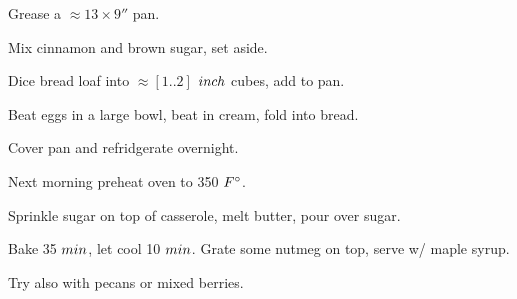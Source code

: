 \begin{preparation}
\item Grease a $\approx13\times9''$ pan.

\item Mix cinnamon and brown sugar, set aside.

\item Dice bread loaf into $\approx[1..2]$ $\inch$ cubes, add to pan.

\item Beat eggs in a large bowl, beat in cream, fold into bread.

\item Cover pan and refridgerate overnight.

\item Next morning preheat oven to 350 $\Fahrenheit$.

\item Sprinkle sugar on top of casserole, melt butter, pour over sugar.

\item Bake 35 $\minute$, let cool 10 $\minute$.
    Grate some nutmeg on top, serve w/ maple syrup.
\end{preparation}

\begin{variation}
\item Try also with pecans or mixed berries.
\end{variation}

\recipeend%
